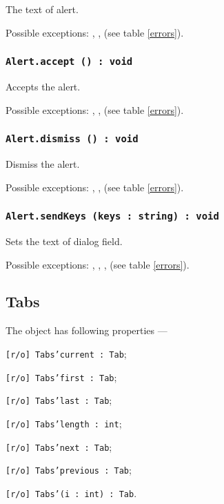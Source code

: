 The text of alert.

Possible exceptions: , ,  (see table \ref{errors}).

\subsubsection{\texttt{Alert.accept () : void}}

Accepts the alert.

Possible exceptions: , ,  (see table \ref{errors}).

\subsubsection{\texttt{Alert.dismiss () : void}}

Dismiss the alert.

Possible exceptions: , ,  (see table \ref{errors}).

\subsubsection{\texttt{Alert.sendKeys (keys : string) : void}}

Sets the text of dialog field.

Possible exceptions: , , ,  (see table \ref{errors}).

\subsection{Tabs}

The object \tabs{} has following properties —
\begin{icItems}
	\item \texttt{[r/o] Tabs'current : Tab};
	\item \texttt{[r/o] Tabs'first : Tab};
	\item \texttt{[r/o] Tabs'last : Tab};
	\item \texttt{[r/o] Tabs'length : int};
	\item \texttt{[r/o] Tabs'next : Tab};
	\item \texttt{[r/o] Tabs'previous : Tab};
	\item \texttt{[r/o] Tabs'(i : int) : Tab}.
\end{icItems}

